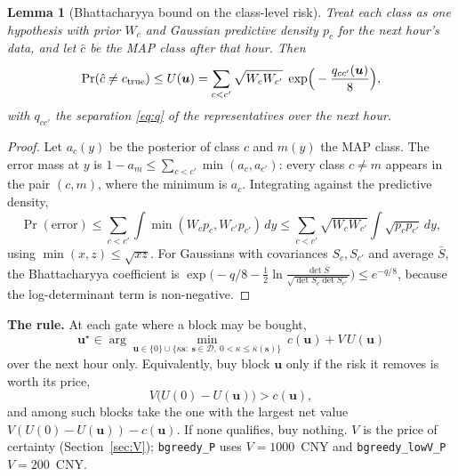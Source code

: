 \documentclass[11pt]{article}
\newtheorem{lemma}{Lemma}
\theoremstyle{definition}
\newcommand{\bu}{\bm{u}}
\newcommand{\bs}{\bm{s}}
\newcommand{\cD}{\mathcal{D}}
\newcommand{\code}[1]{\texttt{#1}}
\begin{document}
{\begin{lemma}[Bhattacharyya bound on the class-level risk]\label{lem:U}
Treat each class as one hypothesis with prior $W_c$ and Gaussian predictive density $p_c$ for the next hour's data, and let $\hat c$ be the MAP class after that hour. Then
\begin{equation}\label{eq:U}
  \Pr(\hat c\neq c_{\rm true})\le U(\bu)=\sum_{c<c'}\sqrt{W_cW_{c'}}\;\exp\!\Big(-\frac{q_{cc'}(\bu)}{8}\Big),
\end{equation}
with $q_{cc'}$ the separation \eqref{eq:q} of the representatives over the next hour.
\end{lemma}
\begin{proof}
Let $a_c(y)$ be the posterior of class $c$ and $m(y)$ the MAP class. The error mass at $y$ is $1-a_m\le\sum_{c<c'}\min(a_c,a_{c'})$: every class $c\neq m$ appears in the pair $(c,m)$, where the minimum is $a_c$. Integrating against the predictive density,
\[
  \Pr(\text{error})\le\sum_{c<c'}\int\min(W_cp_c,W_{c'}p_{c'})\,dy\le\sum_{c<c'}\sqrt{W_cW_{c'}}\int\sqrt{p_cp_{c'}}\,dy ,
\]
using $\min(x,z)\le\sqrt{xz}$. For Gaussians with covariances $S_c,S_{c'}$ and average $\bar S$, the Bhattacharyya coefficient is $\exp\!\big(-q/8-\tfrac12\ln\frac{\det\bar S}{\sqrt{\det S_c\det S_{c'}}}\big)\le e^{-q/8}$, because the log-determinant term is non-negative.
\end{proof}

\textbf{The rule.} At each gate where a block may be bought,
\begin{equation}\label{eq:bgreedy}
  \boxed{\ \bu^\star\in\arg\min_{\bu\in\{0\}\cup\{\kappa\bs:\ \bs\in\cD,\ 0<\kappa\le\bar\kappa(\bs)\}}\ c(\bu)+V\,U(\bu)\ }
\end{equation}
over the next hour only. Equivalently, buy block $\bu$ only if the risk it removes is worth its price,
\begin{equation}\label{eq:buy}
  V\big(U(0)-U(\bu)\big)>c(\bu),
\end{equation}
and among such blocks take the one with the largest net value $V(U(0)-U(\bu))-c(\bu)$. If none qualifies, buy nothing. $V$ is the price of certainty (Section~\ref{sec:V}); \code{bgreedy\_P} uses $V=1000$~CNY and \code{bgreedy\_lowV\_P} $V=200$~CNY.

}
\end{document}
